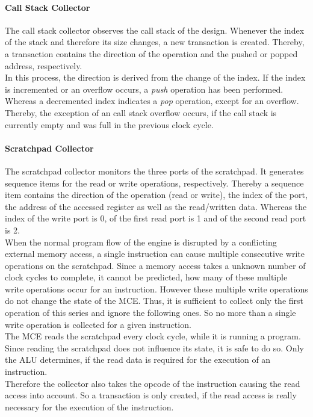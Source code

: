 \paragraph{Call Stack Collector}

The call stack collector observes the call stack of the design.
Whenever the index of the stack and therefore its size changes, a new transaction is created.
Thereby, a transaction contains the direction of the operation and the pushed or popped address, respectively.\\
In this process, the direction is derived from the change of the index.
If the index is incremented or an overflow occurs, a \emph{push} operation has been performed.
Whereas a decremented index indicates a \emph{pop} operation, except for an overflow.
Thereby, the exception of an call stack overflow occurs, if the call stack is currently empty and was full in the previous clock cycle.

\paragraph{Scratchpad Collector}

The scratchpad collector monitors the three ports of the scratchpad.
It generates sequence items for the read or write operations, respectively.
Thereby a sequence item contains the direction of the operation (read or write), the index of the port, the address of the accessed register as well as the read/written data.
Whereas the index of the write port is 0, of the first read port is 1 and of the second read port is 2.\\
When the normal program flow of the engine is disrupted by a conflicting external memory access, a single instruction can cause multiple consecutive write operations on the scratchpad. 
Since a memory access takes a unknown number of clock cycles to complete, it cannot be predicted, how many of these multiple write operations occur for an instruction.
However these multiple write operations do not change the state of the MCE.
Thus, it is sufficient to collect only the first operation of this series and ignore the following ones.
So no more than a single write operation is collected for a given instruction.\\
The MCE reads the scratchpad every clock cycle, while it is running a program.
Since reading the scratchpad does not influence its state, it is safe to do so.
Only the ALU determines, if the read data is required for the execution of an instruction.\\
Therefore the collector also takes the opcode of the instruction causing the read access into account.
So a transaction is only created, if the read access is really necessary for the execution of the instruction.

